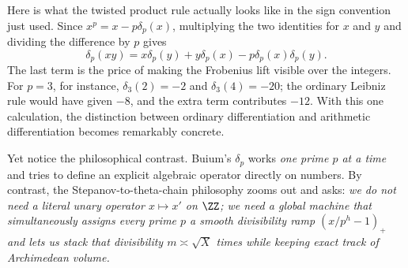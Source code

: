 Here is what the twisted product rule actually looks like in the sign convention just used. Since \(x^p=x-p\delta_p(x)\), multiplying the two identities for \(x\) and \(y\) and dividing the difference by \(p\) gives
\[
 \delta_p(xy)
 =x\delta_p(y)+y\delta_p(x)-p\delta_p(x)\delta_p(y).
\]
The last term is the price of making the Frobenius lift visible over the integers. For \(p=3\), for instance, \(\delta_3(2)=-2\) and \(\delta_3(4)=-20\); the ordinary Leibniz rule would have given \(-8\), and the extra term contributes \(-12\). With this one calculation, the distinction between ordinary differentiation and arithmetic differentiation becomes remarkably concrete.

Yet notice the philosophical contrast. Buium's \(\delta_p\) works \emph{one prime \(p\) at a time} and tries to define an explicit algebraic operator directly on numbers. By contrast, the Stepanov-to-theta-chain philosophy zooms out and asks: \emph{we do not need a literal unary operator \(x \mapsto x'\) on \(\ZZ\); we need a global machine that simultaneously assigns every prime \(p\) a smooth divisibility ramp \((x/p^h - 1)_+\) and lets us stack that divisibility \(m \asymp \sqrt{X}\) times while keeping exact track of Archimedean volume.}
